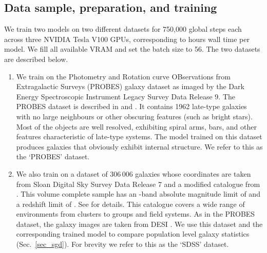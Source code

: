 \documentclass[fleqn,usenatbib]{mnras}
\begin{document}
\subsection{Data sample, preparation, and training}

We train two models on two different datasets for 750,000 global steps each
across three NVIDIA Tesla V100 GPUs, corresponding to  hours wall
time per model. We fill all available VRAM and set the batch size to 56.
The two datasets are described below.

\begin{enumerate}
    \item We train on the Photometry and Rotation curve OBservations  from
        Extragalactic Surveys (PROBES) galaxy dataset as imaged by the Dark
        Energy Spectroscopic Instrument \citep[DESI;][]{cite_desi} Legacy
        Survey Data Release 9. The PROBES dataset is described in
        \citet{cite_stone2019} and \citet{cite_stone2021a}. It contains 1962
        late-type galaxies with no large neighbours or other obscuring features
        (such as bright stars). Most of the objects are well resolved,
        exhibiting spiral arms, bars, and other features characteristic of
        late-type systems. The model trained on this dataset produces galaxies
        that obviously exhibit internal structure. We refer to this as the
        `PROBES' dataset.

    \item We also train on a dataset of 306\,006 galaxies whose coordinates are
        taken from Sloan Digital Sky Survey \citep[SDSS;][]{cite_sdss} Data
        Release 7 \citep{cite_sdssdr7} and a modified catalogue from
        \cite{cite_wilman2010}. This volume complete sample has an
        -band absolute magnitude limit of  and a redshift limit
        of . See \citet{cite_arora2019} for details.
        This catalogue covers a wide range of environments from clusters to
        groups and field systems. As in the PROBES dataset, the galaxy images
        are taken from DESI \citep{cite_desi}. We use this dataset and the
        corresponding trained model to compare population level galaxy
        statistics (Sec.~\ref{sec_sgd}). For brevity we refer to this as the
        `SDSS' dataset.
\end{enumerate}
\end{document}

